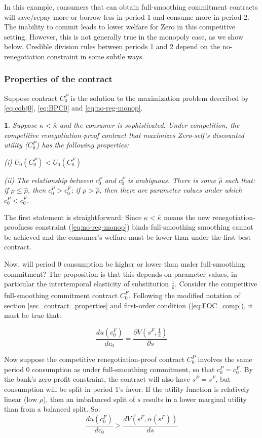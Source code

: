 \documentclass[11pt,english]{article}
\theoremstyle{plain}
\newtheorem{prop}{\protect\propositionname}
\theoremstyle{definition}
\providecommand{\propositionname}{Proposition}
\begin{document}
In this example, consumers that can obtain full-smoothing
commitment contracts  will save/repay more or borrow less in period
1 and consume more in period 2. The inability to commit leads to
lower welfare for Zero in this competitive setting. However, this
is not generally true in the monopoly case, as we show below. Credible division rules between
periods 1 and 2 depend on the no-renegotiation constraint in some
subtle ways.

\subsubsection{Properties of the contract}

Suppose contract $C_{0}^{P}$ is the solution to the maximization
problem described by \ref{eq:cobj0}, \ref{eq:BPC0} and \ref{eq:no-reg-monop}.
\begin{prop}
Suppose $\kappa<\bar{\kappa}$ and the consumer is sophisticated.
Under competition, the competitive renegotiation-proof contract that
maximizes Zero-self's discounted utility ($C_{0}^{P}$) has the following
properties:

(i) $U_{0}\left(C_{0}^{P}\right)<U_{0}\left(C_{0}^{F}\right)$

(ii) The relationship between $c_{0}^{P}$ and $c_{0}^{F}$ is ambiguous.
There is some $\hat{\rho}$ such that: if $\rho\leq\hat{\rho}$, then
$c_{0}^{P}>c_{0}^{F}$; if $\rho>\hat{\rho}$, then there are parameter
values under which $c_{0}^{P}<c_{0}^{F}$. 
\end{prop}
The first statement is straightforward: Since $\kappa<\bar{\kappa}$
means the new renegotiation-proofness constraint (\ref{eq:no-reg-monop})
binds full-smoothing smoothing cannot be achieved and the consumer's
welfare must be lower than under the first-best contract.

Now, will period 0 consumption be higher or lower than under full-smoothing
commitment? The proposition is that this depends on parameter values,
in particular the intertemporal elasticity of substitution $\frac{1}{\rho}$.
Consider the competitive full-smoothing commitment contract $C_{0}^{F}$.
Following the modified notation of section  \ref{sec_contract_properties} and first-order condition (\ref{eq:FOC_comp}), it
must be true that:

\[
\frac{du\left(c_{0}^{F}\right)}{dc_{0}}=\frac{\partial V\left(s^{F},\frac{1}{2}\right)}{\partial s}
\]

Now suppose the competitive renegotiation-proof contract $C_{0}^{P}$
 involves the same period 0 consumption as under full-smoothing
commitment, so that $c_{0}^{P}=c_{0}^{F}$. By the bank's zero-profit
constraint, the contract will also have $s^{P}=s^{F}$, but consumption
will be split in period 1's favor. If the utility function is relatively
linear (low $\rho$), then an imbalanced split of $s$ results in
a lower marginal utility than from a balanced split. So: 
\[
\frac{du\left(c_{0}^{F}\right)}{dc_{0}}>\frac{dV\left(s^{F},\alpha\left(s^{F}\right)\right)}{ds}
\]
\end{document}
